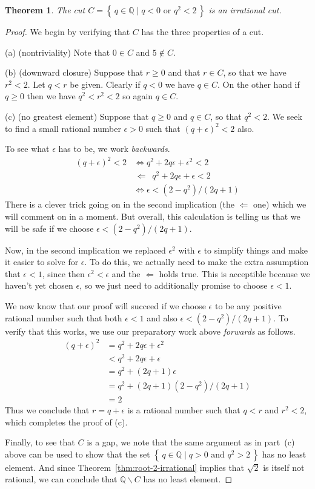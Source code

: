 \documentclass[11pt,oneside]{amsbook}
\newcommand{\set}[1]{\left\{\,#1\,\right\}}
\newcommand{\Q}{\mathbb Q}
\renewcommand{\setminus}{\smallsetminus}
\theoremstyle{definition}
\theoremstyle{plain}
\newtheorem{theorem}{Theorem}[section]
\theoremstyle{definition}
\theoremstyle{remark}
\numberwithin{equation}{section}
\numberwithin{figure}{section}
\begin{document}
\begin{theorem}
  \label{thm:root-2-cut}
  The cut $C=\set{q\in\Q\mid q<0\text{ or }q^2<2}$ is an irrational cut.
\end{theorem}

\begin{proof}
  We begin by verifying that $C$ has the three properties of a cut.

  (a) (nontriviality) Note that $0\in C$ and $5\notin C$.

  (b) (downward closure) Suppose that $r\geq0$ and that $r\in C$, so that we have $r^2<2$. Let $q<r$ be given. Clearly if $q<0$ we have $q\in C$. On the other hand if $q\geq0$ then we have $q^2<r^2<2$ so again $q\in C$.

  (c) (no greatest element) Suppose that $q\geq0$ and $q\in C$, so that $q^2<2$. We seek to find a small rational number $\epsilon>0$ such that $(q+\epsilon)^2<2$ also.

  To see what $\epsilon$ has to be, we work \emph{backwards}.
  \begin{align*}
    (q+\epsilon)^2<2&\iff q^2+2q\epsilon+\epsilon^2<2\\
    &\,\Longleftarrow\,\,\, q^2+2q\epsilon+\epsilon<2\\
    &\iff \epsilon<(2-q^2)/(2q+1)
  \end{align*}
  There is a clever trick going on in the second implication (the $\Longleftarrow$ one) which we will comment on in a moment. But overall, this calculation is telling us that we will be safe if we choose $\epsilon<(2-q^2)/(2q+1)$.

  Now, in the second implication we replaced $\epsilon^2$ with $\epsilon$ to simplify things and make it easier to solve for $\epsilon$. To do this, we actually need to make the extra assumption that $\epsilon<1$, since then $\epsilon^2<\epsilon$ and the $\Longleftarrow$ holds true. This is acceptible because we haven't yet chosen $\epsilon$, so we just need to additionally promise to choose $\epsilon<1$.

  We now know that our proof will succeed if we choose $\epsilon$ to be any positive rational number such that both $\epsilon<1$ and also $\epsilon<(2-q^2)/(2q+1)$. To verify that this works, we use our preparatory work above \emph{forwards} as follows.
  \begin{align*}
    (q+\epsilon)^2&=q^2+2q\epsilon+\epsilon^2\\
    &<q^2+2q\epsilon+\epsilon\\
    &=q^2+(2q+1)\epsilon\\
    &=q^2+(2q+1)(2-q^2)/(2q+1)\\
    &=2
  \end{align*}
  Thus we conclude that $r=q+\epsilon$ is a rational number such that $q<r$ and $r^2<2$, which completes the proof of (c).

  Finally, to see that $C$ is a gap, we note that the same argument as in part~(c) above can be used to show that the set $\set{q\in\Q\mid q>0\text{ and }q^2>2}$ has no least element. And since Theorem~\ref{thm:root-2-irrational} implies that $\sqrt2$ is itself not rational, we can conclude that $\Q\setminus C$ has no least element.
\end{proof}
\end{document}
